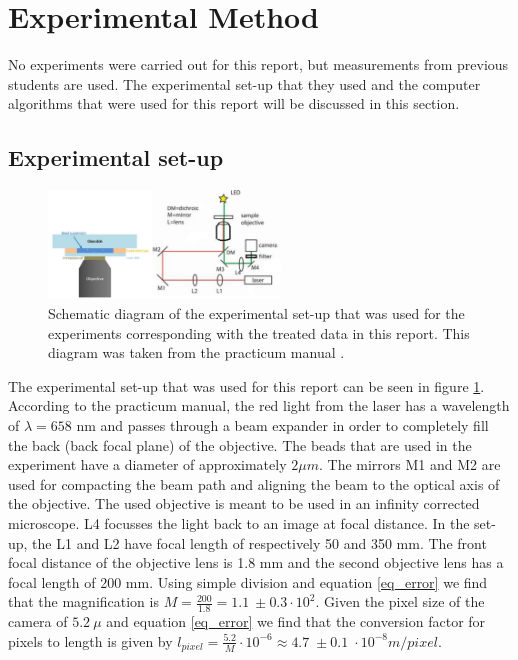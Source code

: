 \section{Experimental Method}

No experiments were carried out for this report, but measurements from previous students are used. The experimental set-up that they used and the computer algorithms that were used for this report will be discussed in this section.

\subsection{Experimental set-up}

\begin{figure}
    \centering
    \includegraphics[width=0.55\textwidth,keepaspectratio]{figures/setup.png}
    \caption{Schematic diagram of the experimental set-up that was used for the experiments corresponding with the treated data in this report. This diagram was taken from the practicum manual \cite{practicum_manual}.}
    \label{fig_setup}
\end{figure}


The experimental set-up that was used for this report can be seen in figure \ref{fig_setup}. 
According to the practicum manual, the red light from the laser has a wavelength of $\lambda = 658$ nm and passes through a beam expander in order to completely fill the back (back focal plane) of the objective. 
The beads that are used in the experiment have a diameter of approximately $ 2 \mu m$. 
The mirrors M1 and M2 are used for compacting the beam path and aligning the beam to the optical axis of the objective. 
The used objective is meant to be used in an infinity corrected microscope. 
L4 focusses the light back to an image at focal distance. 
In the set-up, the L1 and L2 have focal length of respectively 50 and 350 mm. The front focal distance of the objective lens is 1.8 mm and the second objective lens has a focal length of 200 mm. Using simple division and equation \ref{eq_error} we find that the magnification is  $ M = \frac{200}{1.8} = 1.1  \: \pm 0.3 \cdot 10^2$. Given the pixel size of the camera of $ 5.2 \: \mu $  and equation  \ref{eq_error} we find that the conversion factor for pixels to length is given by $l_{pixel} = \frac{5.2}{M} \cdot 10^{-6} \approx 4.7 \; \pm 0.1 \; \cdot 10^{-8} m/pixel $.


